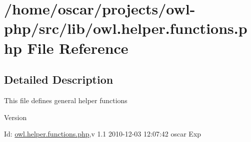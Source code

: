 \section{/home/oscar/projects/owl-\/php/src/lib/owl.helper.functions.php File Reference}
\label{owl_8helper_8functions_8php}


\subsection{Detailed Description}
This file defines general helper functions \begin{DoxyVersion}{Version}

\end{DoxyVersion}
\begin{DoxyParagraph}{Id:}
\hyperlink{owl_8helper_8functions_8php}{owl.helper.functions.php},v 1.1 2010-\/12-\/03 12:07:42 oscar Exp 
\end{DoxyParagraph}

